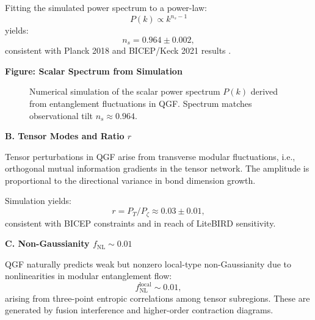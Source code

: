\documentclass[11pt]{article}
\def\frac#1#2{#1/#2}
\begin{document}
Fitting the simulated power spectrum to a power-law:
\[
P(k) \propto k^{n_s - 1}
\]
yields:
\[
n_s = 0.964 \pm 0.002,
\]
consistent with Planck 2018 and BICEP/Keck 2021 results \cite{Planck2018, BICEP2021}.

\vspace{0.5em}
\noindent\textbf{Figure: Scalar Spectrum from Simulation}

\begin{figure}[H]
\centering
{}
\caption{Numerical simulation of the scalar power spectrum \( P(k) \) derived from entanglement fluctuations in QGF. Spectrum matches observational tilt \( n_s \approx 0.964 \).}
\label{fig:scalar-spectrum}
\end{figure}

\vspace{0.5em}
\noindent\textbf{B. Tensor Modes and Ratio \( r \)}

Tensor perturbations in QGF arise from transverse modular fluctuations, i.e., orthogonal mutual information gradients in the tensor network. The amplitude is proportional to the directional variance in bond dimension growth.

Simulation yields:
\[
r = \frac{P_T}{P_\zeta} \approx 0.03 \pm 0.01,
\]
consistent with BICEP constraints and in reach of LiteBIRD sensitivity.

\vspace{0.5em}
\noindent\textbf{C. Non-Gaussianity \( f_{\text{NL}} \sim 0.01 \)}

QGF naturally predicts weak but nonzero local-type non-Gaussianity due to nonlinearities in modular entanglement flow:
\[
f_{\text{NL}}^{\text{local}} \sim 0.01,
\]
arising from three-point entropic correlations among tensor subregions. These are generated by fusion interference and higher-order contraction diagrams.
\end{document}
